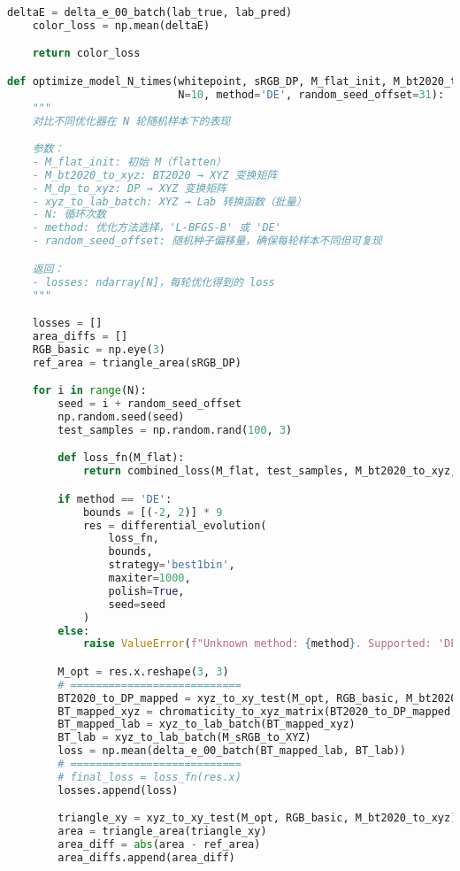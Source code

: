 \begin{lstlisting}[language=Python]
    deltaE = delta_e_00_batch(lab_true, lab_pred)
    color_loss = np.mean(deltaE)

    return color_loss 

def optimize_model_N_times(whitepoint, sRGB_DP, M_flat_init, M_bt2020_to_xyz, M_dp_to_xyz, xyz_to_lab_batch,
                           N=10, method='DE', random_seed_offset=31):
    """
    对比不同优化器在 N 轮随机样本下的表现

    参数：
    - M_flat_init: 初始 M（flatten）
    - M_bt2020_to_xyz: BT2020 → XYZ 变换矩阵
    - M_dp_to_xyz: DP → XYZ 变换矩阵
    - xyz_to_lab_batch: XYZ → Lab 转换函数（批量）
    - N: 循环次数
    - method: 优化方法选择，'L-BFGS-B' 或 'DE'
    - random_seed_offset: 随机种子偏移量，确保每轮样本不同但可复现

    返回：
    - losses: ndarray[N]，每轮优化得到的 loss
    """

    losses = []
    area_diffs = []
    RGB_basic = np.eye(3)
    ref_area = triangle_area(sRGB_DP)

    for i in range(N):
        seed = i + random_seed_offset
        np.random.seed(seed)
        test_samples = np.random.rand(100, 3)

        def loss_fn(M_flat):
            return combined_loss(M_flat, test_samples, M_bt2020_to_xyz, M_dp_to_xyz, xyz_to_lab_batch)

        if method == 'DE':
            bounds = [(-2, 2)] * 9
            res = differential_evolution(
                loss_fn,
                bounds,
                strategy='best1bin',
                maxiter=1000,
                polish=True,
                seed=seed
            )
        else:
            raise ValueError(f"Unknown method: {method}. Supported: 'DE'")

        M_opt = res.x.reshape(3, 3)
        # ===========================
        BT2020_to_DP_mapped = xyz_to_xy_test(M_opt, RGB_basic, M_bt2020_to_xyz)
        BT_mapped_xyz = chromaticity_to_xyz_matrix(BT2020_to_DP_mapped, whitepoint)
        BT_mapped_lab = xyz_to_lab_batch(BT_mapped_xyz)
        BT_lab = xyz_to_lab_batch(M_sRGB_to_XYZ)
        loss = np.mean(delta_e_00_batch(BT_mapped_lab, BT_lab))
        # ===========================
        # final_loss = loss_fn(res.x)
        losses.append(loss)

        triangle_xy = xyz_to_xy_test(M_opt, RGB_basic, M_bt2020_to_xyz)
        area = triangle_area(triangle_xy)
        area_diff = abs(area - ref_area)
        area_diffs.append(area_diff)


\end{lstlisting}
